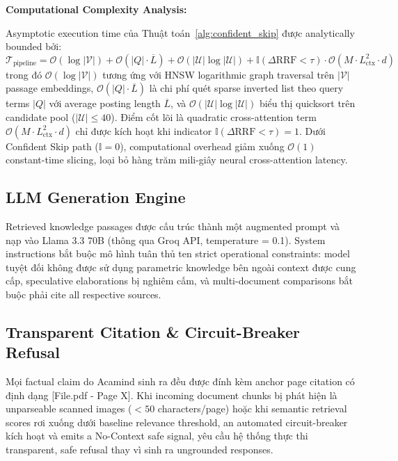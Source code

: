 \documentclass[10pt]{SPIIRAS_Proceedings}
\begin{document}
\smallskip
\noindent\textbf{Computational Complexity Analysis:}\par
Asymptotic execution time của Thuật toán~\ref{alg:confident_skip} được analytically bounded bởi:
\begin{equation}
\mathcal{T}_{\text{pipeline}} = \mathcal{O}(\log |\mathcal{V}|) + \mathcal{O}(|Q| \cdot \overline{L}) + \mathcal{O}(|\mathcal{U}| \log |\mathcal{U}|) + \mathbb{I}(\Delta \text{RRF} < \tau) \cdot \mathcal{O}(M \cdot L_{\text{ctx}}^2 \cdot d)
\end{equation}
trong đó $\mathcal{O}(\log |\mathcal{V}|)$ tương ứng với HNSW logarithmic graph traversal trên $|\mathcal{V}|$ passage embeddings, $\mathcal{O}(|Q| \cdot \overline{L})$ là chi phí quét sparse inverted list theo query terms $|Q|$ với average posting length $\overline{L}$, và $\mathcal{O}(|\mathcal{U}| \log |\mathcal{U}|)$ biểu thị quicksort trên candidate pool ($|\mathcal{U}| \le 40$). Điểm cốt lõi là quadratic cross-attention term $\mathcal{O}(M \cdot L_{\text{ctx}}^2 \cdot d)$ chỉ được kích hoạt khi indicator $\mathbb{I}(\Delta \text{RRF} < \tau) = 1$. Dưới Confident Skip path ($\mathbb{I}=0$), computational overhead giảm xuống $\mathcal{O}(1)$ constant-time slicing, loại bỏ hàng trăm mili-giây neural cross-attention latency.

\subsection{LLM Generation Engine}
Retrieved knowledge passages được cấu trúc thành một augmented prompt và nạp vào Llama 3.3 70B (thông qua Groq API, temperature = 0.1). System instructions bắt buộc mô hình tuân thủ ten strict operational constraints: model tuyệt đối không được sử dụng parametric knowledge bên ngoài context được cung cấp, speculative elaborations bị nghiêm cấm, và multi-document comparisons bắt buộc phải cite all respective sources.

\subsection{Transparent Citation \& Circuit-Breaker Refusal}
Mọi factual claim do Acamind sinh ra đều được đính kèm anchor page citation có định dạng [File.pdf - Page X]. Khi incoming document chunks bị phát hiện là unparseable scanned images ($<50$ characters/page) hoặc khi semantic retrieval scores rơi xuống dưới baseline relevance threshold, an automated circuit-breaker kích hoạt và emits a No-Context safe signal, yêu cầu hệ thống thực thi transparent, safe refusal thay vì sinh ra ungrounded responses.
\end{document}
